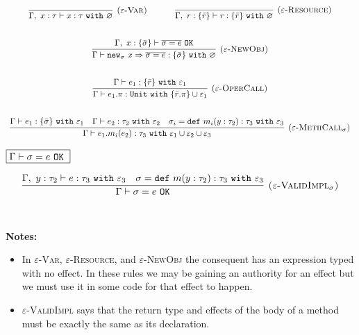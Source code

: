 \documentclass{llncs}
\newcommand{\keywadj}[1]{\mathtt{#1}}
\newcommand{\keyw}[1]{\keywadj{#1}~}
\newcommand{\type}[2]{
	#1~\keyw{with} #2
}
\newcommand{\newsig}[0]{
	\keywadj{new}_\sigma~x \Rightarrow \overline{\sigma = e}
}
\begin{document}
\fbox{$\Gamma \vdash e : \tau~\keyw{with} \varepsilon$}

\[
\begin{array}{c}
\infer[\textsc{($\varepsilon$-Var)}]
  {\Gamma,~x:\tau \vdash x: \type{\tau}{\varnothing} }
  {} 
~~~~~~~~~~
\infer[\textsc{($\varepsilon$-Resource)}]
  {\Gamma,~r :\{\bar r\} \vdash r: \type{   \{ \bar r \}  }{\varnothing}}
  {} \\[5ex]

\infer[\textsc{($\varepsilon$-NewObj)}]
	{\Gamma \vdash \newsig : \{ \bar \sigma \}~\keyw{with} \varnothing}
	{\Gamma,~x : \{ \bar \sigma \} \vdash \overline{\sigma = e}~\keywadj{OK}} \\[5ex]

\infer[\textsc{($\varepsilon$-OperCall)}]
	{\Gamma \vdash e_1.\pi : \keyw{Unit} \keyw{with} \{ \bar r.\pi \} \cup \varepsilon_1}
	{\Gamma \vdash e_1 : \{ \bar r \}~ \keyw{with} \varepsilon_1} \\[5ex]
	
\infer[\textsc{($\varepsilon$-MethCall$_\sigma$)}]
	{\Gamma \vdash e_1.m_i(e_2):\tau_3~\keyw{with} \varepsilon_1 \cup \varepsilon_2 \cup \varepsilon_3}
	{\Gamma \vdash e_1 : \{ \bar \sigma \}~\keyw{with} \varepsilon_1 & \Gamma \vdash e_2 : \tau_2~\keyw{with} \varepsilon_2 & \sigma_i = \keyw{def} m_i(y:\tau_2):\tau_3~\keyw{with} \varepsilon_3}

\end{array}
\]

$\fbox{$\Gamma \vdash \sigma = e~\keyw{OK}$}$

\[
\begin{array}{c}
\infer[\textsc{($\varepsilon$-ValidImpl$_\sigma$)}]
	{\Gamma \vdash \sigma = e~\keywadj{OK}}
	{\Gamma,~y:\tau_2 \vdash e: \tau_3~\keyw{with} \varepsilon_3 & \sigma = \keyw{def} m(y:\tau_2):\tau_3~\keyw{with} \varepsilon_3} \\[5ex]
\end{array}
\]

\noindent \textbf{Notes:}

\begin{itemize}
	\item In \textsc{$\varepsilon$-Var}, \textsc{$\varepsilon$-Resource}, and \textsc{$\varepsilon$-NewObj} the consequent has an expression typed with no effect. In these rules we may be gaining an authority for an effect but we must use it in some code for that effect to happen.
	\item \textsc{$\varepsilon$-ValidImpl} says that the return type and effects of the body of a method must be exactly the same as its declaration.
\end{itemize}
\end{document}
